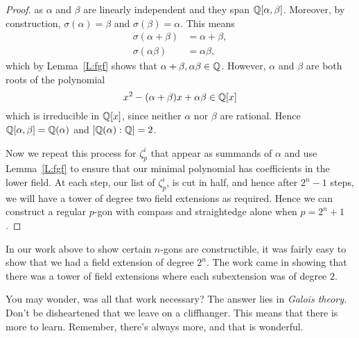 \documentclass{ximera}
\begin{document}
\begin{theorem}
\begin{proof}
    as $\alpha$ and $\beta$ are linearly independent and they span
    $\mathbb Q[\alpha,\beta]$. Moreover, by construction, $\sigma(\alpha) =
    \beta$ and $\sigma(\beta) = \alpha$. This means
    \begin{align*}
      \sigma(\alpha+\beta) &= \alpha + \beta,\\
      \sigma(\alpha\beta) &= \alpha\beta,
    \end{align*}
    which by Lemma~\ref{L:fgf} shows that
    $\alpha+\beta,\alpha\beta\in\mathbb Q$. However, $\alpha$ and $\beta$ are
    both roots of the polynomial
    \[
    x^2 - (\alpha +\beta) x + \alpha\beta\in\mathbb Q[x]
    \]
    which is irreducible in $\mathbb Q[x]$, since neither $\alpha$ nor $\beta$
    are rational. Hence $\mathbb Q[\alpha,\beta]= \mathbb Q(\alpha)$ and
    $[\mathbb Q(\alpha):\mathbb Q] = 2$.


    Now we repeat this process for $\zeta_p^i$ that appear as summands
    of $\alpha$ and use Lemma~\ref{L:fgf} to ensure that our minimal
    polynomial has coefficients in the lower field. At each step, our
    list of $\zeta_p^i$, is cut in half, and hence after $2^n-1$
    steps, we will have a tower of degree two field extensions as
    required.  Hence we can construct a regular $p$-gon with compass
    and straightedge alone when $p=2^n+1$.
  \end{proof}
\end{theorem}

In our work above to show certain $n$-gons are constructible, it was
fairly easy to show that we had a field extension of degree $2^n$. The
work came in showing that there was a tower of field extensions where
each subextension was of degree $2$.

You may wonder, was all that work necessary? The answer lies in
\textit{Galois theory.} Don't be disheartened that we leave on a
cliffhanger. This means that there is more to learn. Remember,
there's always more, and that is wonderful.
\end{document}
